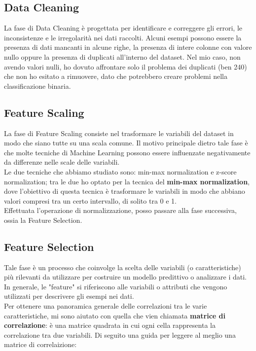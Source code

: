 \documentclass{article}
\begin{document}
\begin{titlepage}
        \subsection{Data Cleaning}
        La fase di Data Cleaning  è progettata per identificare e correggere gli errori, le inconsistenze e le irregolarità nei dati raccolti. Alcuni esempi possono essere la presenza di dati mancanti in alcune righe, la presenza di intere colonne con valore nullo oppure la presenza di duplicati all'interno del dataset. Nel mio caso, non avendo valori nulli, ho dovuto affrontare solo il problema dei duplicati (ben 240) che non ho esitato a rimuovere, dato che potrebbero creare problemi nella classificazione binaria. 

        \newpage
        \subsection{Feature Scaling}
        La fase di Feature Scaling consiste nel trasformare le variabili del dataset in modo che siano tutte su una scala comune. Il motivo principale dietro tale fase è che molte tecniche di Machine Learning possono essere influenzate negativamente da differenze nelle scale delle variabili. \\Le due tecniche che abbiamo studiato sono: min-max normalization e z-score normalization; tra le due ho optato per la tecnica del \textbf{min-max normalization}, dove l'obiettivo di questa tecnica è trasformare le variabili in modo che abbiano valori compresi tra un certo intervallo, di solito tra 0 e 1. \\
        Effettuata l'operazione di normalizzazione, posso passare alla fase successiva, ossia la Feature Selection.

        \subsection{Feature Selection}
        Tale fase è un processo che coinvolge la scelta delle variabili (o caratteristiche) più rilevanti da utilizzare per costruire un modello predittivo o analizzare i dati. In generale, le "feature" si riferiscono alle variabili o attributi che vengono utilizzati per descrivere gli esempi nei dati. \\
        Per ottenere una panoramica generale delle correlazioni tra le varie caratteristiche, mi sono aiutato con quella che vien chiamata \textbf{matrice di correlazione}: è una matrice quadrata in cui ogni cella rappresenta la correlazione tra due variabili. Di seguito una guida per leggere al meglio una matrice di correlaizione:
        

\end{titlepage}
\end{document}
